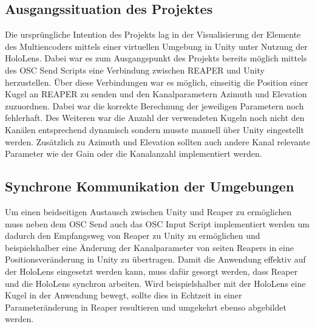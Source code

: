 \documentclass[11pt, titlepage, fleqn]{report}
\begin{document}
            \subsection*{Ausgangssituation des Projektes}
                Die ursprüngliche Intention des Projekts lag in der Visualisierung der Elemente des Multiencoders mittels einer 
                virtuellen Umgebung in Unity unter Nutzung der HoloLens. Dabei war es zum Ausgangspunkt des Projekts bereits 
                möglich mittels des OSC Send Scripts eine Verbindung zwischen REAPER und Unity herzustellen. Über diese 
                Verbindungen war es möglich, einseitig die Position einer Kugel an REAPER zu senden und den Kanalparametern 
                Azimuth und Elevation zuzuordnen. Dabei war die korrekte Berechnung der jeweiligen Parametern noch fehlerhaft. 
                Des Weiteren war die Anzahl der verwendeten Kugeln noch nicht den Kanälen entsprechend dynamisch sondern musste 
                manuell über Unity eingestellt werden. Zusätzlich zu Azimuth und Elevation sollten auch andere Kanal relevante 
                Parameter wie der Gain oder die Kanalanzahl implementiert werden.
            \subsection*{Synchrone Kommunikation der Umgebungen}
                Um einen beidseitigen Austausch zwischen Unity und Reaper zu ermöglichen muss neben dem OSC Send auch das OSC Input 
                Script implementiert werden um dadurch den Empfangsweg von Reaper zu Unity zu ermöglichen und beispielshalber eine 
                Änderung der Kanalparameter von seiten Reapers in eine Positionsveränderung in Unity zu übertragen.\newline	
                Damit die Anwendung effektiv auf der HoloLens eingesetzt werden kann, muss dafür gesorgt werden, dass Reaper und die 
                HoloLens synchron arbeiten. Wird beispielshalber mit der HoloLens eine Kugel in der Anwendung bewegt, sollte dies in 
                Echtzeit in einer Parameteränderung in Reaper resultieren und umgekehrt ebenso abgebildet werden.
\end{document}
